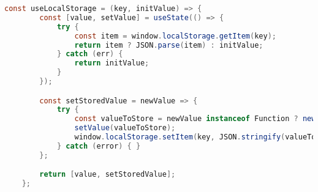 \begin{lstlisting}[language=java]
	const useLocalStorage = (key, initValue) => {
		const [value, setValue] = useState(() => {
			try {
				const item = window.localStorage.getItem(key);
				return item ? JSON.parse(item) : initValue;
			} catch (err) {
				return initValue;
			}
		});

		const setStoredValue = newValue => {
			try {
				const valueToStore = newValue instanceof Function ? newValue(value) : newValue;
				setValue(valueToStore);
				window.localStorage.setItem(key, JSON.stringify(valueToStore));
			} catch (error) { }
		};

		return [value, setStoredValue];
	};
\end{lstlisting}
